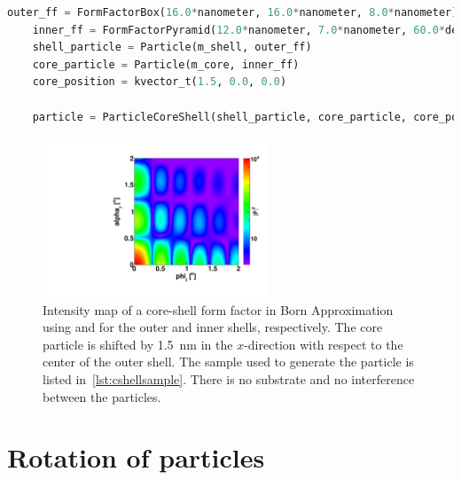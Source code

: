 \clearpage

\begin{lstlisting}[language=python,
  style=eclipseboxed,numbers=none,nolol,caption={\Code{Python} script
    to create a core-shell particle made of a box with a pyramidal shifted inset.},label={lst:cshellsample}]
    outer_ff = FormFactorBox(16.0*nanometer, 16.0*nanometer, 8.0*nanometer) 
    inner_ff = FormFactorPyramid(12.0*nanometer, 7.0*nanometer, 60.0*degree)
    shell_particle = Particle(m_shell, outer_ff)
    core_particle = Particle(m_core, inner_ff)
    core_position = kvector_t(1.5, 0.0, 0.0)

    particle = ParticleCoreShell(shell_particle, core_particle, core_position)
\end{lstlisting}

\begin{figure}[ht]
\begin{center}
\includegraphics[angle=-90,width=0.6\textwidth]{fig/gisasmap/CoreShellParallPyr.pdf}
\end{center}
\caption{Intensity map of a core-shell form factor in Born Approximation using   and  for the outer and inner shells, respectively. The core particle is shifted by 1.5~nm in the $x$-direction with respect to the center of the outer shell. The sample used to generate the particle is listed in~\ref{lst:cshellsample}.  There is no substrate and no interference between the particles.}
\label{fig:FFCoreShellBA}
\end{figure}

\clearpage
\section{Rotation of particles}

